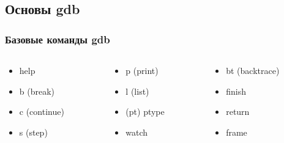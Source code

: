 \subsection[intro]{Основы gdb}
\begin{frame}
  \frametitle{Базовые команды gdb}
  \begin{columns}
    \begin{column}{0.3\textwidth}
      \begin{itemize}
        \item help
        \item b (break)
        \item c (continue)
        \item s (step)
      \end{itemize}
    \end{column}
    
    \begin{column}{0.3\textwidth}
      \begin{itemize}
        \item p (print)
        \item l (list)
        \item (pt) ptype
        \item watch
      \end{itemize}
    \end{column}

    \begin{column}{0.3\textwidth}
      \begin{itemize}
        \item bt (backtrace)
        \item finish
        \item return
        \item frame
      \end{itemize}
    \end{column}
  \end{columns}
\end{frame}

